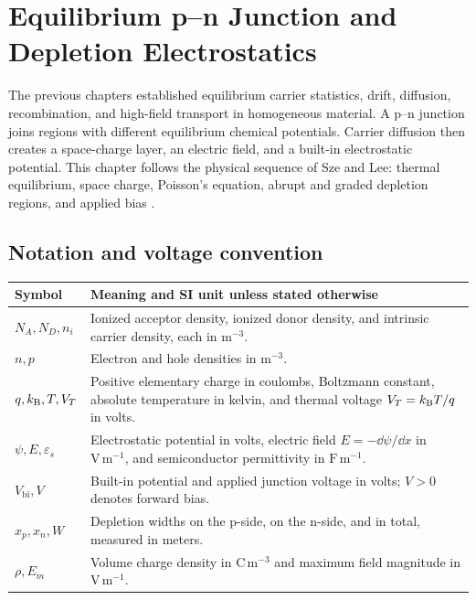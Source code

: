 \chapter{Equilibrium p--n Junction and Depletion Electrostatics}
\label{ch:equilibrium-pn-junction}

The previous chapters established equilibrium carrier statistics, drift,
diffusion, recombination, and high-field transport in homogeneous material.  A
p--n junction joins regions with different equilibrium chemical potentials.
Carrier diffusion then creates a space-charge layer, an electric field, and a
built-in electrostatic potential.  This chapter follows the physical sequence
of Sze and Lee: thermal equilibrium, space charge, Poisson's equation, abrupt
and graded depletion regions, and applied bias \cite[Chap.~3, Secs.~3.1--3.2]{szeLee2012}.

\section{Notation and voltage convention}

\begin{center}
\small
\begin{tabularx}{\textwidth}{@{}lX@{}}
\toprule
Symbol & Meaning and SI unit unless stated otherwise \\
\midrule
$N_A,N_D,n_i$ & Ionized acceptor density, ionized donor density, and intrinsic carrier density, each in $\mathrm{m^{-3}}$. \\
$n,p$ & Electron and hole densities in $\mathrm{m^{-3}}$. \\
$q,k_{\mathrm B},T,V_T$ & Positive elementary charge in coulombs, Boltzmann constant, absolute temperature in kelvin, and thermal voltage $V_T=k_{\mathrm B} T/q$ in volts. \\
$\psi,E,\varepsilon_s$ & Electrostatic potential in volts, electric field $E=-\dd\psi/\dd x$ in $\mathrm{V\,m^{-1}}$, and semiconductor permittivity in $\mathrm{F\,m^{-1}}$. \\
$V_{\mathrm{bi}},V$ & Built-in potential and applied junction voltage in volts; $V>0$ denotes forward bias. \\
$x_p,x_n,W$ & Depletion widths on the p-side, on the n-side, and in total, measured in meters. \\
$\rho,E_m$ & Volume charge density in $\mathrm{C\,m^{-3}}$ and maximum field magnitude in $\mathrm{V\,m^{-1}}$. \\
\bottomrule
\end{tabularx}
\end{center}

